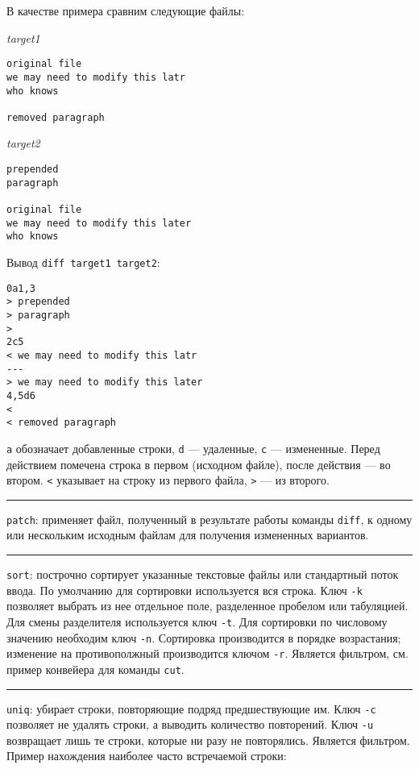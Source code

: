 \documentclass[listings]{labreport}
\begin{document}
В качестве примера сравним следующие файлы:

\begin{multicols}{2}
\noindent\textit{target1}
\begin{verbatim}
original file
we may need to modify this latr
who knows

removed paragraph

\end{verbatim}

\noindent\textit{target2}
\begin{verbatim}
prepended
paragraph

original file
we may need to modify this later
who knows
\end{verbatim}
\end{multicols}

Вывод \texttt{diff target1 target2}:

\begin{verbatim}
0a1,3
> prepended
> paragraph
> 
2c5
< we may need to modify this latr
---
> we may need to modify this later
4,5d6
< 
< removed paragraph
\end{verbatim}

\texttt{a} обозначает добавленные строки, \texttt{d} — удаленные, \texttt{c} —
измененные. Перед действием помечена строка в первом (исходном файле),
после действия — во втором. \texttt{<} указывает на строку из первого файла,
\texttt{>} — из второго.

\noindent\rule{\textwidth}{1pt}

\texttt{patch}: применяет файл, полученный в результате работы команды \texttt{diff},
к одному или нескольким исходным файлам для получения измененных вариантов.

\noindent\rule{\textwidth}{1pt}

\texttt{sort}: построчно сортирует указанные текстовые файлы или стандартный поток ввода.
По умолчанию для сортировки используется вся строка. Ключ \texttt{-k} позволяет
выбрать из нее отдельное поле, разделенное пробелом или табуляцией. Для смены разделителя
используется ключ \texttt{-t}. Для сортировки по числовому значению необходим ключ \texttt{-n}.
Сортировка производится в порядке возрастания; изменение на противополжный производится ключом \texttt{-r}.
Является фильтром, см. пример конвейера для команды \texttt{cut}.

\noindent\rule{\textwidth}{1pt}

\texttt{uniq}: убирает строки, повторяющие подряд предшествующие им. Ключ \texttt{-c} позволяет не удалять строки,
а выводить количество повторений. Ключ \texttt{-u} возвращает лишь те строки, которые ни разу не повторялись.
Является фильтром. Пример нахождения наиболее часто встречаемой строки:
\end{document}
